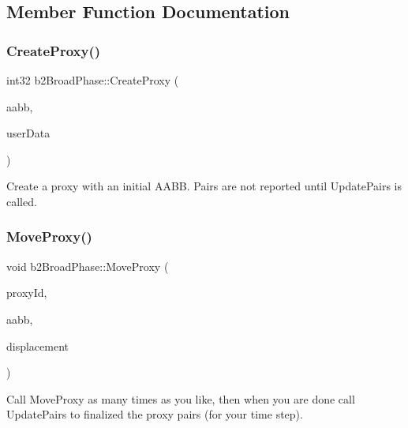 \subsection{Member Function Documentation}
\mbox{\label{classb2_broad_phase_ae2f7af756bc55ece45221466c5af449c}} 
\subsubsection{\texorpdfstring{Create\+Proxy()}{CreateProxy()}}
{\footnotesize\ttfamily int32 b2\+Broad\+Phase\+::\+Create\+Proxy (\begin{DoxyParamCaption}\item[{const \hyperlink{structb2_a_a_b_b}{b2\+A\+A\+BB} \&}]{aabb,  }\item[{void $\ast$}]{user\+Data }\end{DoxyParamCaption})}

Create a proxy with an initial A\+A\+BB. Pairs are not reported until Update\+Pairs is called. \mbox{\label{classb2_broad_phase_a01dc18a19c2b5d0cc1d9cd8c8554234c}} 
\subsubsection{\texorpdfstring{Move\+Proxy()}{MoveProxy()}}
{\footnotesize\ttfamily void b2\+Broad\+Phase\+::\+Move\+Proxy (\begin{DoxyParamCaption}\item[{int32}]{proxy\+Id,  }\item[{const \hyperlink{structb2_a_a_b_b}{b2\+A\+A\+BB} \&}]{aabb,  }\item[{const \hyperlink{structb2_vec2}{b2\+Vec2} \&}]{displacement }\end{DoxyParamCaption})}

Call Move\+Proxy as many times as you like, then when you are done call Update\+Pairs to finalized the proxy pairs (for your time step). \mbox{\label{classb2_broad_phase_a187586ea98b9d16e5ef6e12fa31f8de2}} 
